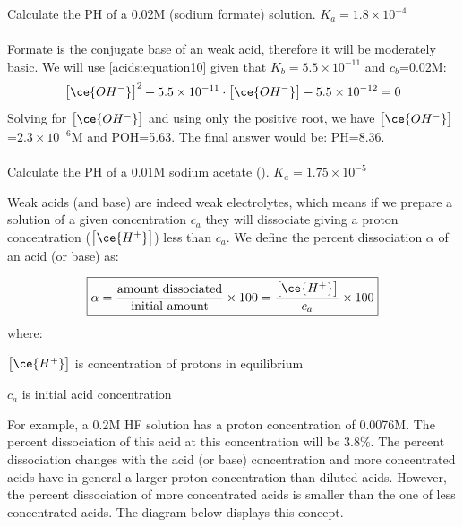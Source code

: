 \documentclass[main.tex]{subfiles}
\newcommand\chapterlabel{acids}
\begin{document}
\begin{description}
\begin{example} %
Calculate the PH of a 0.02M   (sodium formate) solution. $K_a=1.8 \times 10^{-4}$
\\
\\
Formate is the conjugate base of an weak acid, therefore it will be moderately basic. We will use \ref{\chapterlabel:equation10} given that $K_b=5.5 \times 10^{-11}$ and $c_b$=0.02M:
\[ \big[ \ce{OH^-} \big]^2 +5.5 \times 10^{-11}\cdot \big[ \ce{OH^-} \big] -5.5 \times 10^{-12}=0 \]
Solving for $\big[ \ce{OH^-} \big]$ and using only the positive root, we have $\big[ \ce{OH^-} \big]$=$2.3\times 10^{-6}$M and POH=5.63. The final answer would be: PH=8.36.
\\
\faDiamond\ \\
Calculate the PH of a 0.01M sodium acetate (). $K_a=1.75 \times 10^{-5}$
\end{example}%




\item[\docfilehook{\smallpencil Percent dissociation of weak acids and bases}{Percent dissociation of weak acids and bases}] Weak acids (and base) are indeed weak electrolytes, which means if we prepare a solution of a given concentration $c_a$ they will dissociate giving a proton concentration ($\big[ \ce{H^+} \big]$) less than $c_a$. We define the percent dissociation $\alpha$ of an acid (or base) as:

\begin{equation}
\boxed{ \alpha=\frac{\text{amount dissociated}}{\text{initial amount}}\times 100=\frac{\big[ \ce{H^+} \big]}{c_a}\times 100 }\label{\chapterlabel:equation11}
\end{equation}
where:
\begin{where}
 \item $\big[ \ce{H^+} \big]$  is concentration of protons in equilibrium
 \item $c_a$   is initial acid concentration
\end{where}
For example, a 0.2M HF solution has a proton concentration of 0.0076M. The percent dissociation of this acid at this concentration will be 3.8\%. The percent dissociation changes with the acid (or base) concentration and more concentrated acids have in general a larger proton concentration than diluted acids. However, the percent dissociation of more concentrated acids is smaller than the one of less concentrated acids. The diagram below displays this concept.



\end{description}
\end{document}
